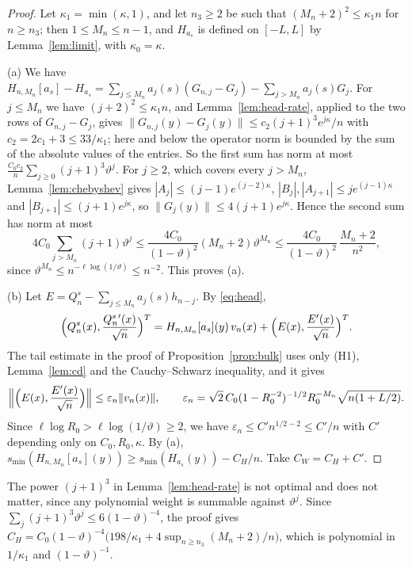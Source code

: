 \documentclass[11pt]{amsart}
\theoremstyle{definition}
\theoremstyle{remark}
\numberwithin{equation}{section}
\newcommand{\eps}{\varepsilon}
\begin{document}
\begin{proof}
Let $\kappa_1=\min(\kappa,1)$, and let $n_3\ge2$ be such that $(M_n+2)^2\le\kappa_1n$ for $n\ge n_3$; then $1\le M_n\le n-1$, and $H_{a_s}$ is defined on $[-L,L]$ by Lemma~\ref{lem:limit}, with $\kappa_0=\kappa$.

(a) We have $H_{n,M_n}[a_s]-H_{a_s}=\sum_{j\le M_n}a_j(s)(G_{n,j}-G_j)-\sum_{j>M_n}a_j(s)G_j$. For $j\le M_n$ we have $(j+2)^2\le\kappa_1n$, and Lemma~\ref{lem:head-rate}, applied to the two rows of $G_{n,j}-G_j$, gives $\|G_{n,j}(y)-G_j(y)\|\le c_2(j+1)^3e^{j\kappa}/n$ with $c_2=2c_1+3\le33/\kappa_1$; here and below the operator norm is bounded by the sum of the absolute values of the entries. So the first sum has norm at most $\frac{C_0c_2}n\sum_{j\ge0}(j+1)^3\vartheta^j$. For $j\ge2$, which covers every $j>M_n$, Lemma~\ref{lem:chebyshev} gives $|A_j|\le(j-1)e^{(j-2)\kappa}$, $|B_j|,|A_{j+1}|\le je^{(j-1)\kappa}$ and $|B_{j+1}|\le(j+1)e^{j\kappa}$, so $\|G_j(y)\|\le4(j+1)e^{j\kappa}$. Hence the second sum has norm at most
\[
4C_0\sum_{j>M_n}(j+1)\vartheta^j\le\frac{4C_0}{(1-\vartheta)^2}(M_n+2)\vartheta^{M_n}\le\frac{4C_0}{(1-\vartheta)^2}\,\frac{M_n+2}{n^2},
\]
since $\vartheta^{M_n}\le n^{-\ell\log(1/\vartheta)}\le n^{-2}$. This proves (a).

(b) Let $E=Q_n^s-\sum_{j\le M_n}a_j(s)h_{n-j}$. By \eqref{eq:head},
\[
\Bigl(Q_n^s(x),\frac{Q_n^s{}'(x)}{\sqrt n}\Bigr)^T=H_{n,M_n}[a_s](y)\,v_n(x)+\Bigl(E(x),\frac{E'(x)}{\sqrt n}\Bigr)^T .
\]
The tail estimate in the proof of Proposition~\ref{prop:bulk} uses only (H1), Lemma~\ref{lem:cd} and the Cauchy--Schwarz inequality, and it gives
\[
\Bigl\|\Bigl(E(x),\frac{E'(x)}{\sqrt n}\Bigr)\Bigr\|\le\eps_n\|v_n(x)\|,\qquad\eps_n=\sqrt2\,C_0(1-R_0^{-2})^{-1/2}R_0^{-M_n}\sqrt{n(1+L/2)} .
\]
Since $\ell\log R_0>\ell\log(1/\vartheta)\ge2$, we have $\eps_n\le C'n^{1/2-2}\le C'/n$ with $C'$ depending only on $C_0,R_0,\kappa$. By (a), $s_{\min}(H_{n,M_n}[a_s](y))\ge s_{\min}(H_{a_s}(y))-C_H/n$. Take $C_W=C_H+C'$.
\end{proof}

The power $(j+1)^3$ in Lemma~\ref{lem:head-rate} is not optimal and does not matter, since any polynomial weight is summable against $\vartheta^j$. Since $\sum_j(j+1)^3\vartheta^j\le6(1-\vartheta)^{-4}$, the proof gives $C_H=C_0(1-\vartheta)^{-4}\bigl(198/\kappa_1+4\sup_{n\ge n_3}(M_n+2)/n\bigr)$, which is polynomial in $1/\kappa_1$ and $(1-\vartheta)^{-1}$.
\end{document}
